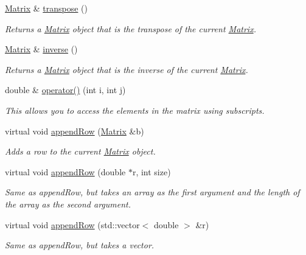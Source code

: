\begin{DoxyCompactItemize}
\hyperlink{class_matrix}{Matrix} \& \hyperlink{class_matrix_ad609fedfd61e93679803bb114e544569}{transpose} ()
\begin{DoxyCompactList}\small\item\em Returns a \hyperlink{class_matrix}{Matrix} object that is the transpose of the current \hyperlink{class_matrix}{Matrix}. \item\end{DoxyCompactList}\item 
\hyperlink{class_matrix}{Matrix} \& \hyperlink{class_matrix_a474b9ebea883f90ee54d963f5af8d33e}{inverse} ()
\begin{DoxyCompactList}\small\item\em Returns a \hyperlink{class_matrix}{Matrix} object that is the inverse of the current \hyperlink{class_matrix}{Matrix}. \item\end{DoxyCompactList}\item 
double \& \hyperlink{class_matrix_a83a1c6c6f2f7c88a72a7ee98cae90c24}{operator()} (int i, int j)
\begin{DoxyCompactList}\small\item\em This allows you to access the elements in the matrix using subscripts. \item\end{DoxyCompactList}\item 
virtual void \hyperlink{class_matrix_a20c175983a6b23a83fccfe8f726b3b07}{appendRow} (\hyperlink{class_matrix}{Matrix} \&b)
\begin{DoxyCompactList}\small\item\em Adds a row to the current \hyperlink{class_matrix}{Matrix} object. \item\end{DoxyCompactList}\item 
virtual void \hyperlink{class_matrix_a55104cb3fcf93a887ac713955fc0f5c9}{appendRow} (double $\ast$r, int size)
\begin{DoxyCompactList}\small\item\em Same as appendRow, but takes an array as the first argument and the length of the array as the second argument. \item\end{DoxyCompactList}\item 
virtual void \hyperlink{class_matrix_a934b0686d9a2b971e9740b9a29224a54}{appendRow} (std::vector$<$ double $>$ \&r)
\begin{DoxyCompactList}\small\item\em Same as appendRow, but takes a vector. \item\end{DoxyCompactList}\item 

\end{DoxyCompactItemize}
